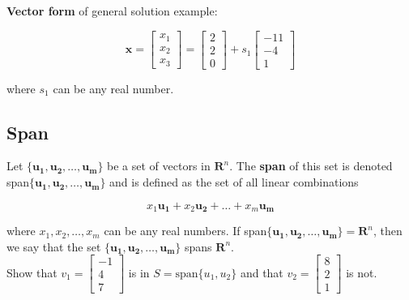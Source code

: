         \textbf{Vector form} of general solution example:

        \[
            \mathbf{x} =
            \begin{bmatrix}
                x_1 \\
                x_2 \\
                x_3
            \end{bmatrix}
            =
            \begin{bmatrix}
                2 \\
                2 \\
                0
            \end{bmatrix}
            + s_1
            \begin{bmatrix}
                -11 \\
                -4 \\
                1
            \end{bmatrix}
        \]

        where $s_1$ can be any real number.

    \subsection{Span}

        Let $\{\mathbf{u_1, u_2, \dots, u_m\}}$ be a set of vectors in $\mathbf{R}^n$. The \textbf{span} of this set is denoted span$\{\mathbf{u_1, u_2, \dots, u_m\}}$ and is defined as the set of all linear combinations

        \[
            x_1 \mathbf{u_1} + x_2 \mathbf{u_2} + \dots + x_m \mathbf{u_m}
        \]

        where $x_1, x_2, \dots, x_m$ can be any real numbers. If span$\{\mathbf{u_1, u_2, \dots, u_m}\} = \mathbf{R}^n$, then we say that the set $\{\mathbf{u_1, u_2, \dots, u_m}\}$ spans $\mathbf{R}^n$. \\

        \textit{} Show that $v_1 = \begin{bmatrix}-1 \\ 4 \\ 7\end{bmatrix}$ is in $S = \text{span}\{u_1, u_2\}$ and that $v_2 = \begin{bmatrix}8\\ 2 \\ 1\end{bmatrix}$ is not. \\

